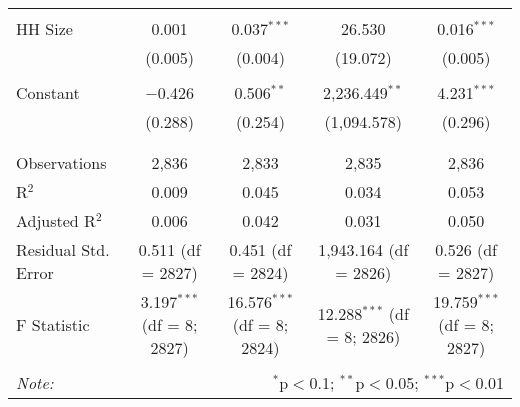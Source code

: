 \begin{table}[!htbp]
\begin{tabular}{@{\extracolsep{5pt}}lcccc}
  & & & & \\ 
 HH Size & 0.001 & 0.037$^{***}$ & 26.530 & 0.016$^{***}$ \\ 
  & (0.005) & (0.004) & (19.072) & (0.005) \\ 
  & & & & \\ 
 Constant & $-$0.426 & 0.506$^{**}$ & 2,236.449$^{**}$ & 4.231$^{***}$ \\ 
  & (0.288) & (0.254) & (1,094.578) & (0.296) \\ 
  & & & & \\ 
\hline \\[-1.8ex] 
Observations & 2,836 & 2,833 & 2,835 & 2,836 \\ 
R$^{2}$ & 0.009 & 0.045 & 0.034 & 0.053 \\ 
Adjusted R$^{2}$ & 0.006 & 0.042 & 0.031 & 0.050 \\ 
Residual Std. Error & 0.511 (df = 2827) & 0.451 (df = 2824) & 1,943.164 (df = 2826) & 0.526 (df = 2827) \\ 
F Statistic & 3.197$^{***}$ (df = 8; 2827) & 16.576$^{***}$ (df = 8; 2824) & 12.288$^{***}$ (df = 8; 2826) & 19.759$^{***}$ (df = 8; 2827) \\ 
\hline 
\hline \\[-1.8ex] 
\textit{Note:}  & \multicolumn{4}{r}{$^{*}$p$<$0.1; $^{**}$p$<$0.05; $^{***}$p$<$0.01} \\ 
\end{tabular} 
\end{table} 
